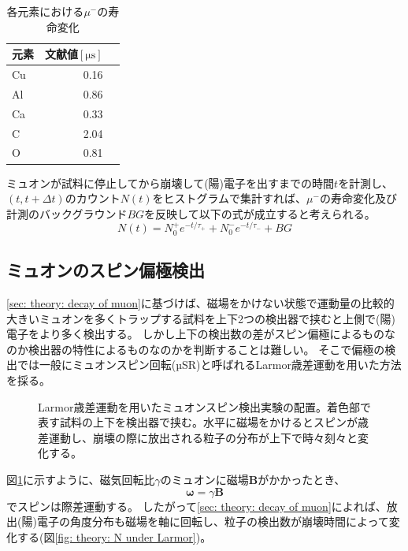 \documentclass[dvipdfmx]{jsarticle}
\begin{document}
\begin{table}
    \centering
    \caption{各元素における$\mu^-$の寿命変化}
    \begin{tabular}{lrr}
        \toprule
        元素 & 文献値$[\unit{\micro\second}]$
        \\
        \midrule
        Cu & 0.16
        \\
        Al & 0.86
        \\
        Ca & 0.33
        \\
        C & 2.04
        \\
        O & 0.81
        \\
        \bottomrule
    \end{tabular}
    \label{table: theory: life of muon}
\end{table}


ミュオンが試料に停止してから崩壊して(陽)電子を出すまでの時間$t$を計測し、$(t,t+\Delta t)$のカウント$N(t)$をヒストグラムで集計すれば、$\mu^-$の寿命変化及び計測のバックグラウンド$BG$を反映して以下の式が成立すると考えられる。
\begin{equation}
    \label{eq: N of t considering different tau and BG}
    N(t)
    =
    N_0^+e^{-t/\tau_+}
    +
    N_0^-e^{-t/\tau_-}
    +
    BG
\end{equation}


\subsection{ミュオンのスピン偏極検出}

\ref{sec: theory: decay of muon}に基づけば、磁場をかけない状態で運動量の比較的大きいミュオンを多くトラップする試料を上下2つの検出器で挟むと上側で(陽)電子をより多く検出する。
しかし上下の検出数の差がスピン偏極によるものなのか検出器の特性によるものなのかを判断することは難しい。
そこで偏極の検出では一般にミュオンスピン回転(µSR)と呼ばれるLarmor歳差運動を用いた方法を採る。

\begin{figure}[b]
    \centering
    
    \caption{Larmor歳差運動を用いたミュオンスピン検出実験の配置。着色部で表す試料の上下を検出器で挟む。水平に磁場をかけるとスピンが歳差運動し、崩壊の際に放出される粒子の分布が上下で時々刻々と変化する。}
    \label{fig: Larmor spin}
\end{figure}

図\ref{fig: Larmor spin}に示すように、磁気回転比$\gamma$のミュオンに磁場$\bm{B}$がかかったとき、
\begin{equation}
    \label{eq: Larmor precession}
    \bm{\omega}=\gamma\bm{B}
\end{equation}
でスピンは際差運動する。
したがって\ref{sec: theory: decay of muon}によれば、放出(陽)電子の角度分布も磁場を軸に回転し、粒子の検出数が崩壊時間によって変化する(図\ref{fig: theory: N under Larmor})。
\end{document}
